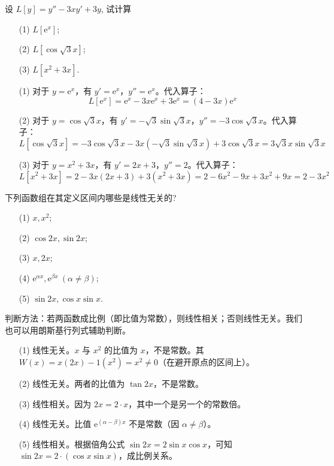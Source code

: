 \documentclass[lang=cn,11pt]{elegantbook}
\begin{document}
\begin{exercise}[线性算子的计算]
设 $L[y]=y''-3xy'+3y$, 试计算
\begin{enumerate}
    \item[(1)] $L[\mathrm{e}^x]$;
    \item[(2)] $L[\cos\sqrt{3}x]$;
    \item[(3)] $L[x^2+3x]$.
\end{enumerate}
\end{exercise}
\begin{solution}
\begin{enumerate}
    \item[(1)] 对于 $y = \mathrm{e}^x$，有 $y' = \mathrm{e}^x$，$y'' = \mathrm{e}^x$。代入算子：
    \[
    L[\mathrm{e}^x] = \mathrm{e}^x - 3x\mathrm{e}^x + 3\mathrm{e}^x = (4 - 3x)\mathrm{e}^x
    \]
    \item[(2)] 对于 $y = \cos\sqrt{3}x$，有 $y' = -\sqrt{3}\sin\sqrt{3}x$，$y'' = -3\cos\sqrt{3}x$。代入算子：
    \[
    L[\cos\sqrt{3}x] = -3\cos\sqrt{3}x - 3x(-\sqrt{3}\sin\sqrt{3}x) + 3\cos\sqrt{3}x = 3\sqrt{3}x\sin\sqrt{3}x
    \]
    \item[(3)] 对于 $y = x^2+3x$，有 $y' = 2x+3$，$y'' = 2$。代入算子：
    \[
    L[x^2+3x] = 2 - 3x(2x+3) + 3(x^2+3x) = 2 - 6x^2 - 9x + 3x^2 + 9x = 2 - 3x^2
    \]
\end{enumerate}
\end{solution}

\begin{exercise}[函数组的线性相关性]
下列函数组在其定义区间内哪些是线性无关的?
\begin{enumerate}
    \item[(1)] $x,x^2$;
    \item[(2)] $\cos2x,\sin2x$;
    \item[(3)] $x,2x$;
    \item[(4)] $\mathrm{e}^{\alpha x},\mathrm{e}^{\beta x}\ (\alpha\neq\beta)$;
    \item[(5)] $\sin2x,\cos x\sin x$.
\end{enumerate}
\end{exercise}
\begin{solution}
判断方法：若两函数成比例（即比值为常数），则线性相关；否则线性无关。我们也可以用朗斯基行列式辅助判断。
\begin{enumerate}
    \item[(1)] 线性无关。$x$ 与 $x^2$ 的比值为 $x$，不是常数。其 $W(x) = x(2x) - 1(x^2) = x^2 \neq 0$（在避开原点的区间上）。
    \item[(2)] 线性无关。两者的比值为 $\tan 2x$，不是常数。
    \item[(3)] 线性相关。因为 $2x = 2 \cdot x$，其中一个是另一个的常数倍。
    \item[(4)] 线性无关。比值 $\mathrm{e}^{(\alpha-\beta)x}$ 不是常数（因 $\alpha \neq \beta$）。
    \item[(5)] 线性相关。根据倍角公式 $\sin 2x = 2\sin x\cos x$，可知 $\sin 2x = 2 \cdot (\cos x\sin x)$，成比例关系。
\end{enumerate}
\end{solution}
\end{document}
